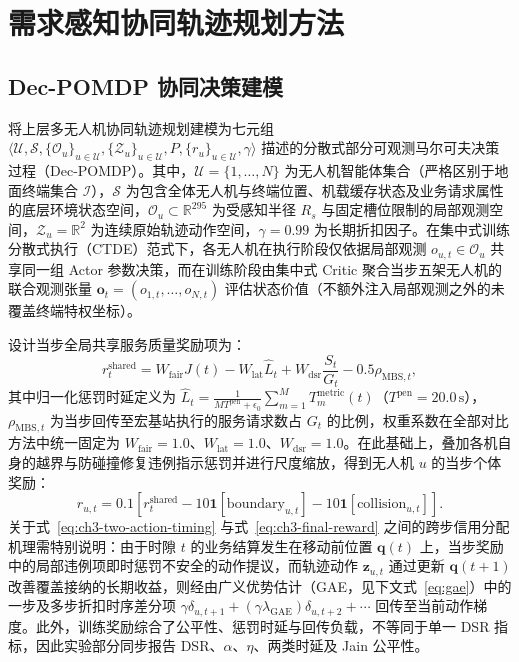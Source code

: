 \section{需求感知协同轨迹规划方法}
\label{sec:upper-dec-pomdp}

\subsection{Dec-POMDP 协同决策建模}
\label{sec:dec-pomdp-motivation}
\label{sec:upper-reward}

将上层多无人机协同轨迹规划建模为七元组 $\langle\mathcal{U},\allowbreak\mathcal{S},\allowbreak\{\mathcal{O}_u\}_{u\in\mathcal{U}},\allowbreak\{\mathcal{Z}_u\}_{u\in\mathcal{U}},\allowbreak P,\allowbreak\{r_u\}_{u\in\mathcal{U}},\allowbreak\gamma\rangle$ 描述的分散式部分可观测马尔可夫决策过程（Dec-POMDP）。其中，$\mathcal{U}=\{1,\ldots,N\}$ 为无人机智能体集合（严格区别于地面终端集合 $\mathcal{I}$），$\mathcal{S}$ 为包含全体无人机与终端位置、机载缓存状态及业务请求属性的底层环境状态空间，$\mathcal{O}_u\subset\mathbb{R}^{295}$ 为受感知半径 $R_s$ 与固定槽位限制的局部观测空间，$\mathcal{Z}_u=\mathbb{R}^2$ 为连续原始轨迹动作空间，$\gamma=0.99$ 为长期折扣因子。在集中式训练分散式执行（CTDE）范式下，各无人机在执行阶段仅依据局部观测 $o_{u,t}\in\mathcal{O}_u$ 共享同一组 Actor 参数决策，而在训练阶段由集中式 Critic 聚合当步五架无人机的联合观测张量 $\mathbf{o}_t=(o_{1,t},\ldots,o_{N,t})$ 评估状态价值（不额外注入局部观测之外的未覆盖终端特权坐标）。

设计当步全局共享服务质量奖励项为：
\begin{equation}
 r_t^{\mathrm{shared}}=
 W_{\mathrm{fair}}J(t)-W_{\mathrm{lat}}\widehat{L}_t+W_{\mathrm{dsr}}\frac{S_t}{G_t}
 -0.5\rho_{\mathrm{MBS},t},
 \label{eq:upper-reward}
\end{equation}
其中归一化惩罚时延定义为 $\widehat{L}_t=\frac{1}{MT^{\mathrm{pen}}+\epsilon_0}\sum_{m=1}^{M}T_m^{\mathrm{metric}}(t)$（$T^{\mathrm{pen}}=20.0\,\mathrm{s}$），$\rho_{\mathrm{MBS},t}$ 为当步回传至宏基站执行的服务请求数占 $G_t$ 的比例，权重系数在全部对比方法中统一固定为 $W_{\mathrm{fair}}=1.0$、$W_{\mathrm{lat}}=1.0$、$W_{\mathrm{dsr}}=1.0$。在此基础上，叠加各机自身的越界与防碰撞修复违例指示惩罚并进行尺度缩放，得到无人机 $u$ 的当步个体奖励：
\begin{equation}
 r_{u,t}=0.1\left[r_t^{\mathrm{shared}}
 -10\mathbf1[\mathrm{boundary}_{u,t}]
 -10\mathbf1[\mathrm{collision}_{u,t}]\right].
 \label{eq:ch3-final-reward}
\end{equation}
关于式~\eqref{eq:ch3-two-action-timing} 与式~\eqref{eq:ch3-final-reward} 之间的跨步信用分配机理需特别说明：由于时隙 $t$ 的业务结算发生在移动前位置 $\mathbf{q}(t)$ 上，当步奖励中的局部违例项即时惩罚不安全的动作提议，而轨迹动作 $\mathbf{z}_{u,t}$ 通过更新 $\mathbf{q}(t+1)$ 改善覆盖接纳的长期收益，则经由广义优势估计（GAE，见下文式~\eqref{eq:gae}）中的一步及多步折扣时序差分项 $\gamma\delta_{u,t+1}+(\gamma\lambda_{\mathrm{GAE}})\delta_{u,t+2}+\cdots$ 回传至当前动作梯度。此外，训练奖励综合了公平性、惩罚时延与回传负载，不等同于单一 DSR 指标，因此实验部分同步报告 DSR、$\alpha$、$\eta$、两类时延及 Jain 公平性。

